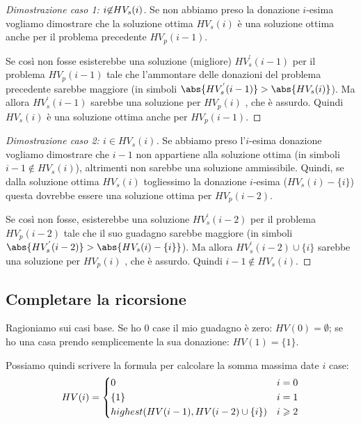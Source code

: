 \begin{proof}[Dimostrazione caso 1: \(i {\protect\not\in} HV_{s}(i)\)]
Se non abbiamo preso la donazione \(i\)-esima vogliamo dimostrare che la soluzione ottima \(HV_{s}(i)\) è una soluzione ottima anche per il problema precedente \(HV_{p}(i-1)\).

Se così non fosse esisterebbe una soluzione (migliore) \(HV_{s}^{'} (i-1)\) per il problema \(HV_{p}(i-1)\) tale che l'ammontare delle donazioni del problema precedente sarebbe maggiore (in simboli \(\abs{HV_{s}^{'} (i-1)} > \abs{HV_{s}(i)}\)).
Ma allora \(HV_{s}^{'} (i-1)\) sarebbe una soluzione per \(HV_{p}(i)\)%
, che è assurdo.
Quindi \(HV_{s}(i)\) è una soluzione ottima anche per \(HV_{p}(i-1)\).
\end{proof}

\begin{proof}[Dimostrazione caso 2: \(i \in HV_{s}(i)\)]
Se abbiamo preso l'\(i\)-esima donazione vogliamo dimostrare che \(i-1\) non appartiene alla soluzione ottima (in simboli \(i-1 \not\in HV_{s}(i)\)), altrimenti non sarebbe una soluzione ammissibile.
Quindi, se dalla soluzione ottima \(HV_{s}(i)\) togliessimo la donazione \(i\)-esima (\(HV_{s}(i) - \{i\}\)) questa dovrebbe essere una soluzione ottima per \(HV_{p} (i-2)\).

Se così non fosse, esisterebbe una soluzione \(HV_{s}^{'} (i-2)\) per il problema \(HV_{p} (i-2)\) tale che il suo guadagno sarebbe maggiore (in simboli \(\abs{HV_{s}^{'} (i-2)} > \abs{HV_{s} (i) - \{i\}}\)).
Ma allora \(HV_{s}^{'} (i-2) \cup \{i\}\) sarebbe una soluzione per \(HV_{p}(i)\)%
, che è assurdo.
Quindi \(i-1 \not\in HV_s(i)\).
\end{proof}

\subsection{Completare la ricorsione}

Ragioniamo sui casi base.
Se ho \(0\) case il mio guadagno è zero: \(HV(0) = \emptyset\);
se ho una casa prendo semplicemente la sua donazione: \(HV(1) = \{1\}\).

Possiamo quindi scrivere la formula per calcolare la somma massima date \(i\) case:
\[
    HV(i) =
    \begin{dcases}
        0                                    & i = 0         \\
        \{1\}                                & i = 1         \\
        highest(HV(i-1), HV(i-2) \cup \{i\}) & i \geqslant 2 \\
    \end{dcases}
\]

